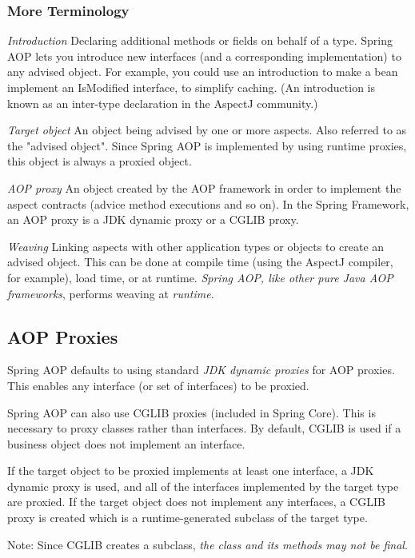 \documentclass{scrartcl}
\begin{document}
\subsubsection{More Terminology}

\textit{Introduction}
Declaring additional methods or fields on behalf of a type. Spring AOP lets you introduce new interfaces (and a corresponding implementation) to any advised object. For example, you could use an introduction to make a bean implement an IsModified interface, to simplify caching. (An introduction is known as an inter-type declaration in the AspectJ community.)

\textit{Target object}
An object being advised by one or more aspects. Also referred to as the "advised object". Since Spring AOP is implemented by using runtime proxies, this object is always a proxied object.

\textit{AOP proxy}
An object created by the AOP framework in order to implement the aspect contracts (advice method executions and so on). In the Spring Framework, an AOP proxy is a JDK dynamic proxy or a CGLIB proxy.

\textit{Weaving}
Linking aspects with other application types or objects to create an advised object. This can be done at compile time (using the AspectJ compiler, for example), load time, or at runtime. \textit{Spring AOP, like other pure Java AOP frameworks}, performs weaving at \textit{runtime}.

\subsection{AOP Proxies}

Spring AOP defaults to using standard\textit{ JDK dynamic proxies} for AOP proxies. This enables any interface (or set of interfaces) to be proxied.

Spring AOP can also use CGLIB proxies (included in Spring Core). This is necessary to proxy classes rather than interfaces. By default, CGLIB is used if a business object does not implement an interface.

If the target object to be proxied implements at least one interface, a JDK dynamic proxy is used, and all of the interfaces implemented by the target type are proxied. If the target object does not implement any interfaces, a CGLIB proxy is created which is a runtime-generated subclass of the target type.

Note: Since CGLIB creates a subclass, \textit{the class and its methods may not be final}.
\end{document}
